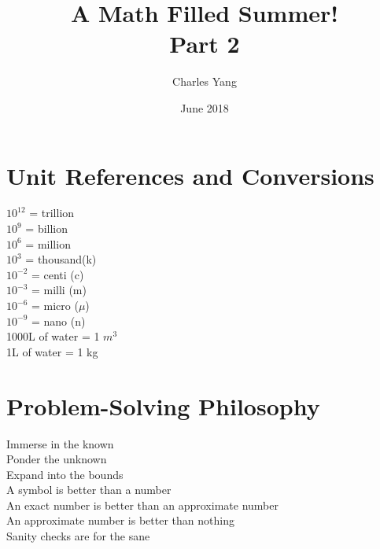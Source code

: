 \documentclass{article}
\title{%
  A Math Filled Summer! \\
  \large Part 2}
\author{Charles Yang }
\date{June 2018}
\begin{document}
\maketitle
\begin{center}
    \section*{Unit References and Conversions}
    $10^{12}$ = trillion\\
    $10^9$ = billion\\
    $10^6$ = million\\
    $10^3$ = thousand(k)\\
    $10^{-2}$ = centi (c)\\
    $10^{-3}$ = milli (m)\\
    $10^{-6}$ = micro ($\mu$)\\
    $10^{-9}$ = nano (n)\\
    1000L of water = 1 $m^3$\\
    1L of water = 1 kg\\
    
    
    \section*{Problem-Solving Philosophy}
    Immerse in the known\\
    Ponder the unknown\\
    Expand into the bounds\\
    A symbol is better than a number\\
    An exact number is better than an approximate number\\
    An approximate number is better than nothing\\
    Sanity checks are for the sane\\
    
    
\end{center}

\newpage
\end{document}
